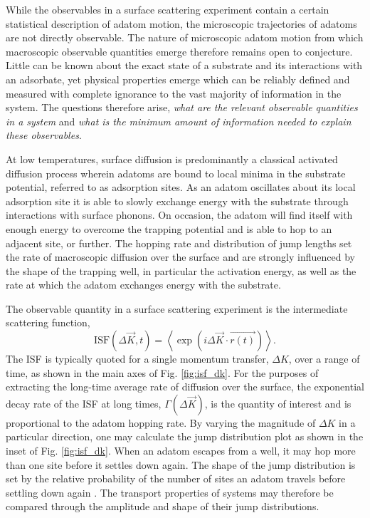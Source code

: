 \documentclass[7pt]{article}
\begin{document}
While the observables in a surface scattering experiment contain a certain statistical description of adatom motion\cite{vanHowe}, the microscopic trajectories of adatoms are not directly observable. The nature of microscopic adatom motion from which macroscopic observable quantities emerge therefore remains open to conjecture. Little can be known about the exact state of a substrate and its interactions with an adsorbate, yet physical properties emerge which can be reliably defined and measured with complete ignorance to the vast majority of information in the system. The questions therefore arise, \emph{what are the relevant observable quantities in a system} and \emph{what is the minimum amount of information needed to explain these observables}. 

At low temperatures, surface diffusion is predominantly a classical activated diffusion process\cite{someone} wherein adatoms are bound to local minima in the substrate potential, referred to as adsorption sites. As an adatom oscillates about its local adsorption site it is able to slowly exchange energy with the substrate through interactions with surface phonons. On occasion, the adatom will find itself with enough energy to overcome the trapping potential and is able to hop to an adjacent site, or further. The hopping rate and distribution of jump lengths set the rate of macroscopic diffusion over the surface and are strongly influenced by the shape of the trapping well, in particular the activation energy, as well as the rate at which the adatom exchanges energy with the substrate.

The observable quantity in a surface scattering experiment is the intermediate scattering function,
$$
\mathrm{ISF}(\Delta{\vec{K}}, t) = \left<\exp\left(i\Delta{\vec{K}}\cdot\vec{r(t)}\right)\right>.
$$
The ISF is typically quoted for a single momentum transfer, $\Delta{K}$, over a range of time, as shown in the main axes of Fig. \ref{fig:isf_dk}. For the purposes of extracting the long-time average rate of diffusion over the surface, the exponential decay rate of the ISF at long times, $\Gamma(\Delta{\vec{K}})$, is the quantity of interest and is proportional to the adatom hopping rate\cite{Chudley}. By varying the magnitude of $\Delta{K}$ in a particular direction, one may calculate the jump distribution plot as shown in the inset of Fig. \ref{fig:isf_dk}. When an adatom escapes from a well, it may hop more than one site before it settles down again. The shape of the jump distribution is set by the relative probability of the number of sites an adatom travels before settling down again \cite{Chudley}. The transport properties of systems may therefore be compared through the amplitude and shape of their jump distributions.
\end{document}
